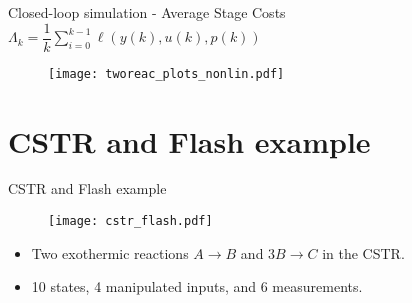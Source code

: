 \documentclass[xcolor=dvipsnames, 8pt]{beamer} %
\begin{document}
\begin{frame}{Closed-loop simulation - Average Stage Costs}
	\centering
	$\Lambda_k = \dfrac{1}{k}\sum_{i=0}^{k-1} \ell(y(k), u(k), p(k))$
	\vspace{-0.05in}
	\begin{figure}
	\texttt{[image: tworeac\_plots\_nonlin.pdf]}
	\end{figure}
\end{frame}

\section{CSTR and Flash example}

\begin{frame}{CSTR and Flash example}
\begin{figure}
	\texttt{[image: cstr\_flash.pdf]}
\end{figure}
\begin{itemize}
	\item Two exothermic reactions $A \rightarrow B$ and $3B \rightarrow C$
	in the CSTR.
	\item 10 states, 4 manipulated inputs, and 6 measurements.
\end{itemize}
\end{frame}
\end{document}
